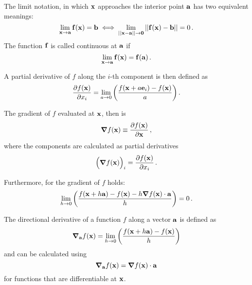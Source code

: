         The limit notation, in which $\vb{x}$ approaches the interior point $\vb{a}$ has two equivalent meanings:
        \begin{equation}
            \lim_{\vb{x} \to \vb{a}} \vb{f}(\vb{x}) = \vb{b} \iff \lim_{ ||\vb{x} - \vb{a}|| \to \vb{0}} ||\vb{f}(\vb{x}) - \vb{b}|| = 0 \thinspace .
        \end{equation}
        The function $\vb{f}$ is called continuous at $\vb{a}$ if
        \begin{equation}
            \lim_{\vb{x} \to \vb{a}} \vb{f}(\vb{x}) = \vb{f}(\vb{a}) \thinspace .
        \end{equation}





        A partial derivative of $f$ along the $i$-th component is then defined as
        \begin{equation}
            \pdv{f(\vb{x})}{x_i} = \lim_{a \to 0} \qty( \frac{f(\vb{x} + a \vb{e}_i) - f(\vb{x})}{a} ) \thinspace .
        \end{equation}

        The gradient of $f$ evaluated at $\vb{x}$, then is
        \begin{equation}
            \grad{f(\vb{x})} \equiv \pdv{f(\vb{x})}{\vb{x}} \thinspace ,
        \end{equation}
        where the components are calculated as partial derivatives
        \begin{equation}
            \Big( \grad{f(\vb{x})} \Big)_i = \pdv{f(\vb{x})}{x_i} \thinspace .
        \end{equation}

        Furthermore, for the gradient of $f$ holds:
        \begin{equation}
            \lim_{h \to 0} \qty( \frac{f(\vb{x} + h \vb{a}) - f(\vb{x}) - h \grad{f(\vb{x})} \cdot \vb{a}}{h} ) = 0 \thinspace .
        \end{equation}

        The directional derivative of a function $f$ along a vector $\vb{a}$ is defined as
        \begin{equation}
            \grad_{\vb{a}} f(\vb{x}) = \lim_{h \to 0} \qty( \frac{f(\vb{x} + h \vb{a}) - f(\vb{x})}{h} )
        \end{equation}
        and can be calculated using
        \begin{equation}
            \grad_{\vb{a}} f(\vb{x}) = \grad{f(\vb{x})} \cdot \vb{a}
        \end{equation}
        for functions that are differentiable at $\vb{x}$. \\

